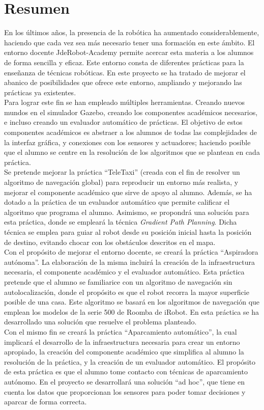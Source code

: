 \chapter*{Resumen}

En los últimos años, la presencia de la robótica ha aumentado considerablemente, haciendo que cada vez sea más necesario tener una formación en este ámbito. El entorno docente JdeRobot-Academy permite acercar esta materia a los alumnos de forma sencilla y eficaz. Este entorno consta de diferentes prácticas para la enseñanza de técnicas robóticas. En este proyecto se ha tratado de mejorar el abanico de posibilidades que ofrece este entorno, ampliando y mejorando las prácticas ya existentes.\\

Para lograr este fin se han empleado múltiples herramientas. Creando nuevos mundos en el simulador Gazebo, creando los componentes académicos necesarios, e incluso creando un evaluador automático de prácticas. El objetivo de estos componentes académicos es abstraer a los alumnos de todas las complejidades de la interfaz gráfica, y conexiones con los sensores y actuadores; haciendo posible que el alumno se centre en la resolución de los algoritmos que se plantean en cada práctica.\\

Se pretende mejorar la práctica ``TeleTaxi'' (creada con el fin de resolver un algoritmo de navegación global) para reproducir un entorno más realista, y mejorar el componente académico que sirve de apoyo al alumno. Además, se ha dotado a la práctica de un evaluador automático que permite calificar el algoritmo que programa el alumno. Asimismo, se propondrá una solución para esta práctica, donde se empleará la técnica \textit{Gradient Path Planning}. Dicha técnica se emplea para guiar al robot desde su posición inicial hasta la posición de destino, evitando chocar con los obstáculos descritos en el mapa.\\

Con el propósito de mejorar el entorno docente, se creará la práctica ``Aspiradora autónoma''. La elaboración de la misma incluirá la creación de la infraestructura necesaria, el componente académico y el evaluador automático. Esta práctica pretende que el alumno se familiarice con un algoritmo de navegación sin autolocalización, donde el propósito es que el robot recorra la mayor superficie posible de una casa. Este algoritmo se basará en los algoritmos de navegación que emplean los modelos de la serie 500 de Roomba de iRobot. En esta práctica se ha desarrollado una solución que resuelve el problema planteado.\\

Con el mismo fin se creará la práctica ``Aparcamiento automático'', la cual implicará el desarrollo de la infraestructura necesaria para crear un entorno apropiado, la creación del componente académico que simplifica al alumno la resolución de la práctica, y la creación de un evaluador automático. El propósito de esta práctica es que el alumno tome contacto con técnicas de aparcamiento autónomo. En el proyecto se desarrollará una solución “ad hoc”, que tiene en cuenta los datos que proporcionan los sensores para poder tomar decisiones y aparcar de forma correcta.
